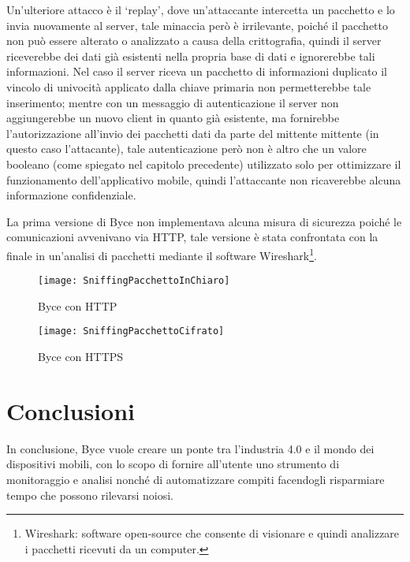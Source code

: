 \documentclass[target=bach]{thud}
\begin{document}
    Un'ulteriore attacco è il `replay', dove un'attaccante intercetta un pacchetto e lo invia nuovamente al server, tale minaccia però è irrilevante, poiché il pacchetto non può essere alterato o analizzato a causa della crittografia, quindi il server riceverebbe dei dati già esistenti nella propria base di dati e ignorerebbe tali informazioni.
    Nel caso il server riceva un pacchetto di informazioni duplicato il vincolo di univocità applicato dalla chiave primaria non permetterebbe tale inserimento; mentre con un messaggio di autenticazione il server non aggiungerebbe un nuovo client in quanto già esistente, ma fornirebbe l'autorizzazione all'invio dei pacchetti dati da parte del mittente mittente (in questo caso l'attacante), tale autenticazione però non è altro che un valore booleano (come spiegato nel capitolo precedente) utilizzato solo per ottimizzare il funzionamento dell'applicativo mobile, quindi l'attaccante non ricaverebbe alcuna informazione confidenziale.


    La prima versione di Byce non implementava alcuna misura di sicurezza poiché le comunicazioni avvenivano via HTTP,
    tale versione è stata confrontata con la finale in un'analisi di pacchetti mediante il software Wireshark\footnote[1]{Wireshark: software open-source che consente di visionare e quindi analizzare i pacchetti ricevuti da un computer.}.

    \graphicspath{ {./img/} }
    \begin{figure}[h]
        \centering
        \texttt{[image: SniffingPacchettoInChiaro]}
        \caption{Byce con HTTP}
        \label{fig:usecase}

    \end{figure}
    \graphicspath{ {./img/} }
    \begin{figure}[h]
        \centering
        \texttt{[image: SniffingPacchettoCifrato]}
        \caption{Byce con HTTPS}
        \label{fig:usecase}
    \end{figure}



\chapter{Conclusioni}

In conclusione, Byce vuole creare un ponte tra l'industria 4.0 e il mondo dei dispositivi mobili, con lo scopo di fornire all'utente uno strumento di monitoraggio e analisi nonché di automatizzare compiti facendogli risparmiare tempo che possono rilevarsi noiosi.
\end{document}
